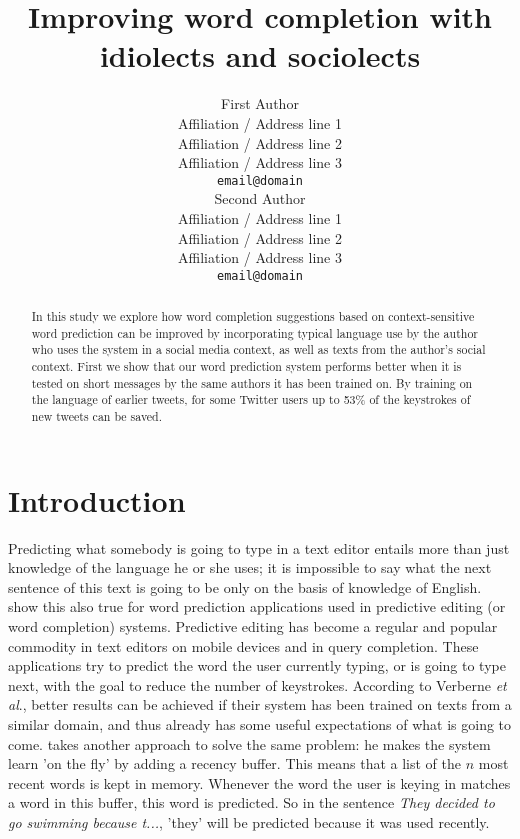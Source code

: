 \documentclass[11pt]{article}
\title{Improving word completion with idiolects and sociolects}
\author{First Author \\
  Affiliation / Address line 1 \\
  Affiliation / Address line 2 \\
  Affiliation / Address line 3 \\
  {\tt email@domain} \\\And
  Second Author \\
  Affiliation / Address line 1 \\
  Affiliation / Address line 2 \\
  Affiliation / Address line 3 \\
  {\tt email@domain} \\}
\date{}
\begin{document}
\maketitle

\begin{abstract} 
In this study we explore how word completion suggestions based on context-sensitive word prediction can be improved by incorporating typical language use by the author who uses the system in a social media context, as well as texts from the author's social context. First we show that our word prediction system performs better when it is tested on short messages by the same authors it has been trained on. By training on the language of earlier tweets, for some Twitter users up to 53\% of the keystrokes of new tweets can be saved. 

\end{abstract}

\section{Introduction}
Predicting what somebody is going to type in a text editor entails more than just knowledge of the language he or she uses; it is impossible to say what the next sentence of this text is going to be only on the basis of knowledge of English.  show this also true for word prediction applications used in predictive editing (or word completion) systems. Predictive editing has become a regular and popular commodity in text editors on mobile devices and in query completion. These applications try to predict the word the user currently typing, or is going to type next, with the goal to reduce the number of keystrokes. According to Verberne {\it et al}., better results can be achieved if their system has been trained on texts from a similar domain, and thus already has some useful expectations of what is going to come.  takes another approach to solve the same problem: he makes the system learn 'on the fly' by adding a recency buffer. This means that a list of the $n$ most recent words is kept in memory. Whenever the word the user is keying in matches a word in this buffer, this word is predicted. So in the sentence \emph{They decided to go swimming because t...}, 'they' will be predicted because it was used recently.
\end{document}
